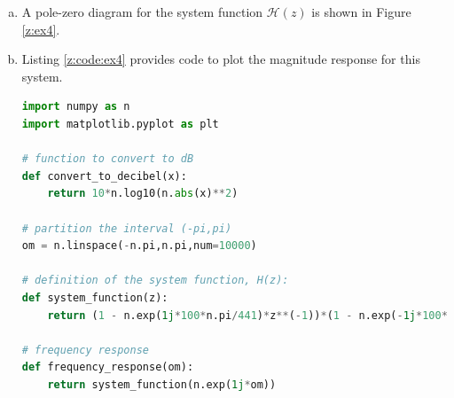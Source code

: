 \begin{enumerate}
\begin{enumerate}[a)]
\item A pole-zero diagram for the system function $\mathcal{H}(z)$ is shown in Figure \ref{z:ex4}.

\begin{marginfigure}[-5cm]
\begin{center}
\end{center}
\caption{The zeros of the system function $\mathcal{H}(z)$,
have $\alpha_k=\{e^{10i\pi/441},e^{-10i\pi/441},e^{20i\pi/441},e^{-20i\pi/441}\}$. Zeros are marked with blue circles and poles are marked with red crosses.}
\label{z:ex4}
\end{marginfigure}

\item Listing \ref{z:code:ex4} provides code to plot the magnitude response for this system.

\begin{lstlisting}[language=Python,caption=Code to plot the magnitude response,label=z:code:ex4]
import numpy as n
import matplotlib.pyplot as plt

# function to convert to dB
def convert_to_decibel(x):
    return 10*n.log10(n.abs(x)**2)

# partition the interval (-pi,pi)
om = n.linspace(-n.pi,n.pi,num=10000)

# definition of the system function, H(z):
def system_function(z):
    return (1 - n.exp(1j*100*n.pi/441)*z**(-1))*(1 - n.exp(-1j*100*n.pi/441)*z**(-1))*(1 - n.exp(20*1j*n.pi/441)*z**(-1))*(1 - n.exp(-20*1j*n.pi/441)*z**(-1))*z**4

# frequency response
def frequency_response(om):
    return system_function(n.exp(1j*om))


\end{lstlisting}
\end{enumerate}
\end{enumerate}
